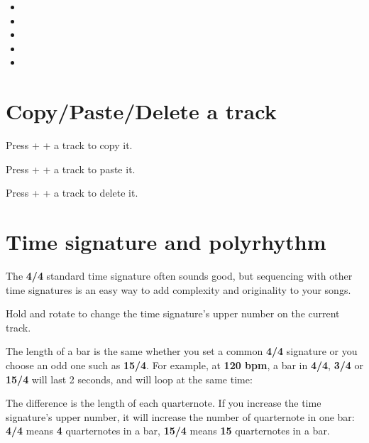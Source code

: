 \begin{itemize}
\item {}
\item {}
\item {}
\item {}
\item {}
\end{itemize}


\section{Copy/Paste/Delete a track}

Press  +  + a track \stepbystepicon{} to copy it.

Press  +  + a track \stepbystepicon{} to paste it.


Press  +  + a track \stepbystepicon{} to delete it.


\section{Time signature and polyrhythm}

The \textbf{4/4} standard time signature often sounds good, but sequencing with other time signatures is an easy way to add complexity and originality to your songs.


Hold  and rotate \encodericon{} to change the time signature's upper number on the current track.

The length of a bar is the same whether you set a common \textbf{4/4} signature or you choose an odd one such as \textbf{15/4}. For example, at \textbf{120 bpm}, a bar in \textbf{4/4}, \textbf{3/4} or \textbf{15/4} will last 2 seconds, and will loop at the same time:


The difference is the length of each quarternote. If you increase the time signature's upper number, it will increase the number of quarternote in one bar: \textbf{4/4} means \textbf{4} quarternotes in a bar, \textbf{15/4} means \textbf{15} quarternotes in a bar.

